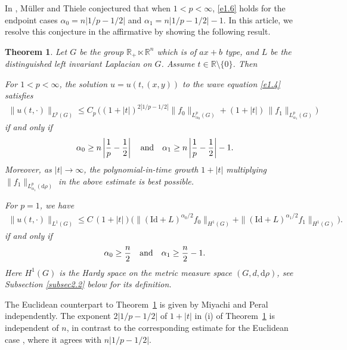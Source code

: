 \documentclass[a4paper,12pt]{amsart}
\numberwithin{equation}{section}
\newtheorem{theorem}{Theorem}
\theoremstyle{definition}
\theoremstyle{remark}
\numberwithin{theorem}{section}
\newcommand{\R}{\mathbb{R}}
\newcommand{\Id}{\mathrm{Id}}
\renewcommand{\d}{\mathrm{d}}
\begin{document}
In \cite[Remark 8.1]{MuTh}, M\"{u}ller and Thiele conjectured that when $1<p<\infty$, \eqref{e1.6} holds for the endpoint cases $\alpha_0=n|{1/p}-{1/2}|$ and $\alpha_1=n|{1/p}-{1/2}|-1$.
In this article, we resolve this conjecture in the affirmative by showing the following result.

\begin{theorem}\label{thm1.1}
Let $G$ be the group $\R_+\ltimes \R^n$ which is of $ax+b$ type, and $L$ be the distinguished left invariant Laplacian on $G$. Assume $t\in\R\setminus\{0\}$. Then
\begin{asparaenum}[\rm (i)]
\item For $1<p<\infty$, the solution $u=u(t,(x,y))$ to the wave equation \eqref{e1.4} satisfies 
\begin{align}\label{s1e5}
\|u(t,\cdot)\|_{L^p(G)}\leq C_p\,\Big((1+|t|)^{2|1/p-1/2|}\|f_0\|_{L^p_{\alpha_0}(G)}+(1+|t|)\,\|f_1\|_{L^p_{\alpha_1}(G)}\Big) 
\end{align} 
if and only if 
\begin{align*}
\alpha_0\geq n\left|{1\over p}-{1\over 2}\right|
\quad \mbox{and}\quad \alpha_1\geq n\left|{1\over p}-{1\over 2}\right|-1.
\end{align*}
Moreover, as $|t|\to\infty$, the polynomial-in-time growth $1+|t|$ multiplying $\|f_1\|_{L^p_{\alpha_1}(\mathrm{d}\rho)}$ in the above estimate is best possible.
\smallskip
\item
For $p=1$, we have	
\begin{align}\label{s1e6}
\|u(t,\cdot)\|_{L^1(G)}\leq C\,(1+|t|) \big(\|(\Id+L)^{\alpha_0/2}f_0\|_{H^1(G)}+\|(\Id+L)^{\alpha_1/2}f_1\|_{H^1(G)}\big).
\end{align}
if and only if 
\begin{align*}
\alpha_0\geq{n\over 2}\quad \mbox{and}\quad \alpha_1\geq{n\over 2}-1.
\end{align*}
Here $H^1(G)$ is the Hardy space on the metric measure space $(G,d,\d\rho)$, see Subsection \ref{subsec2.2} below for its definition.
\end{asparaenum}
\end{theorem}


The Euclidean counterpart to Theorem~\ref{thm1.1} is given by Miyachi \cite{Mi} and Peral \cite{Pe} independently. The exponent $2|1/p-1/2|$ of $1+|t|$ in {\rm(i)} of Theorem~\ref{thm1.1} is independent of $n$, in contrast to the corresponding estimate for the Euclidean case \cite{Mi,Pe}, where it agrees with $n|1/p-1/2|$. 
\end{document}
